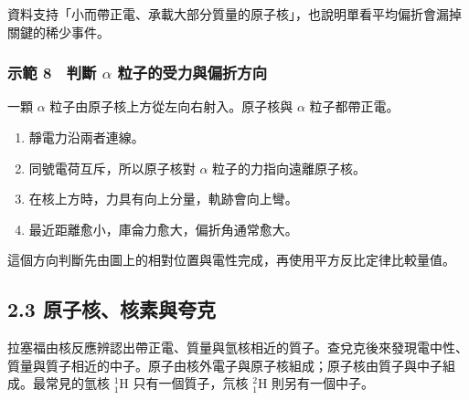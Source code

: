 \documentclass[11pt,a4paper]{article}
\providecommand{\tightlist}{%
  \setlength{\itemsep}{0pt}\setlength{\parskip}{0pt}}
\begin{document}
資料支持「小而帶正電、承載大部分質量的原子核」，也說明單看平均偏折會漏掉關鍵的稀少事件。

\subsubsection{\texorpdfstring{示範 8　判斷 \(\alpha\) 粒子的受力與偏折方向}{示範 8　判斷 \textbackslash alpha 粒子的受力與偏折方向}}\label{ux793aux7bc4-8-ux5224ux65b7-alpha-ux7c92ux5b50ux7684ux53d7ux529bux8207ux504fux6298ux65b9ux5411}

一顆 \(\alpha\) 粒子由原子核上方從左向右射入。原子核與 \(\alpha\) 粒子都帶正電。

\begin{enumerate}
\def\labelenumi{\arabic{enumi}.}
\tightlist
\item
  靜電力沿兩者連線。
\item
  同號電荷互斥，所以原子核對 \(\alpha\) 粒子的力指向遠離原子核。
\item
  在核上方時，力具有向上分量，軌跡會向上彎。
\item
  最近距離愈小，庫侖力愈大，偏折角通常愈大。
\end{enumerate}

這個方向判斷先由圖上的相對位置與電性完成，再使用平方反比定律比較量值。

\subsection{2.3 原子核、核素與夸克}\label{ux539fux5b50ux6838ux6838ux7d20ux8207ux5938ux514b}

拉塞福由核反應辨認出帶正電、質量與氫核相近的質子。查兌克後來發現電中性、質量與質子相近的中子。原子由核外電子與原子核組成；原子核由質子與中子組成。最常見的氫核 \(^1_1\mathrm H\) 只有一個質子，氘核 \(^2_1\mathrm H\) 則另有一個中子。
\end{document}
